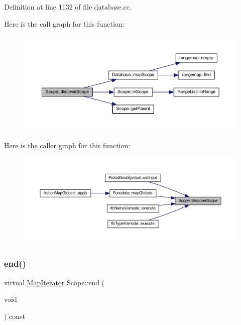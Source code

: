 Definition at line 1132 of file database.\+cc.

Here is the call graph for this function\+:
\nopagebreak
\begin{figure}[H]
\begin{center}
\leavevmode
\includegraphics[width=350pt]{class_scope_aaef5f179b42a9696fd077dbc7144ecc2_cgraph}
\end{center}
\end{figure}
Here is the caller graph for this function\+:
\nopagebreak
\begin{figure}[H]
\begin{center}
\leavevmode
\includegraphics[width=350pt]{class_scope_aaef5f179b42a9696fd077dbc7144ecc2_icgraph}
\end{center}
\end{figure}
\mbox{\label{class_scope_a186b8c11ebef0f2d3838bfe1e46b6db6}} 
\subsubsection{\texorpdfstring{end()}{end()}}
{\footnotesize\ttfamily virtual \mbox{\hyperlink{class_map_iterator}{Map\+Iterator}} Scope\+::end (\begin{DoxyParamCaption}\item[{void}]{ }\end{DoxyParamCaption}) const\hspace{0.3cm}{\ttfamily [pure virtual]}}




